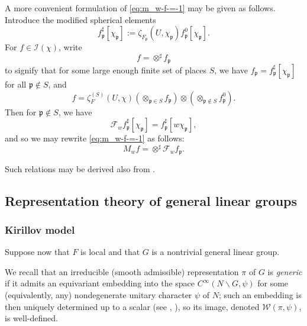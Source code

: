 \documentclass[reqno]{amsart}
\theoremstyle{plain} \newtheorem{theorem} {Theorem}
\theoremstyle{definition} \newtheorem{definition} [theorem] {Definition}
\theoremstyle{itplain} %
\numberwithin{equation}{section}
\numberwithin{theorem}{section}
\begin{document}
A more convenient formulation of \eqref{eq:m_w-f-=-1} may be given as follows.  Introduce the modified spherical elements
\begin{equation*}
f_\mathfrak{p}^\sharp[\chi_\mathfrak{p}] := \zeta_{F_\mathfrak{p}}(U,\chi_\mathfrak{p}) f_\mathfrak{p}^0[\chi_\mathfrak{p}].
\end{equation*}
For $f \in \mathcal{I}(\chi)$, write
\begin{equation*}
  f = \otimes^\sharp f_\mathfrak{p}
\end{equation*}
to signify that for some large enough finite set of places $S$, we have $f_\mathfrak{p} = f_\mathfrak{p} ^\sharp [\chi_\mathfrak{p}]$ for all $\mathfrak{p} \notin S$, and
\begin{equation*}
  f = \zeta_F^{(S)}(U,\chi)
  (\otimes_{\mathfrak{p} \in S} f_\mathfrak{p} )
  \otimes
  (\otimes_{\mathfrak{p} \notin S} f_\mathfrak{p}^0 ).
\end{equation*}
Then for $\mathfrak{p} \notin S$, we have
\begin{equation}\label{eq:normalized-F-w-preserves-basic-vector}
\mathcal{F}_w f_\mathfrak{p}^\sharp[\chi_\mathfrak{p}] = f_\mathfrak{p} ^\sharp [w \chi_\mathfrak{p}],
\end{equation}
and so we may rewrite \eqref{eq:m_w-f-=-1} as follows:
\begin{equation}\label{eq:m_w-f-=-2}
  M_w f = \otimes ^\sharp \mathcal{F}_w f_\mathfrak{p}.
\end{equation}

\begin{remark}
  Such relations may be derived also from \cite[p373]{MR3468638}.
\end{remark}


\subsection{Representation theory of general linear groups}


\subsubsection{Kirillov model}\label{sec:local-prelim-kirillov-model}
Suppose now that $F$ is local and that $G$ is a nontrivial general linear group.

We recall that an irreducible (smooth admissible) representation $\pi$ of $G$ is \emph{generic} if it admits an equivariant embedding into the space $C^\infty(N \backslash G, \psi)$ for some (equivalently, any) nondegenerate unitary character $\psi$ of $N$; such an embedding is then uniquely determined up to a scalar (see \cite{MR348047}, \cite[\S1]{MR546599}), so its image, denoted $\mathcal{W}(\pi,\psi)$, is well-defined.
\end{document}
